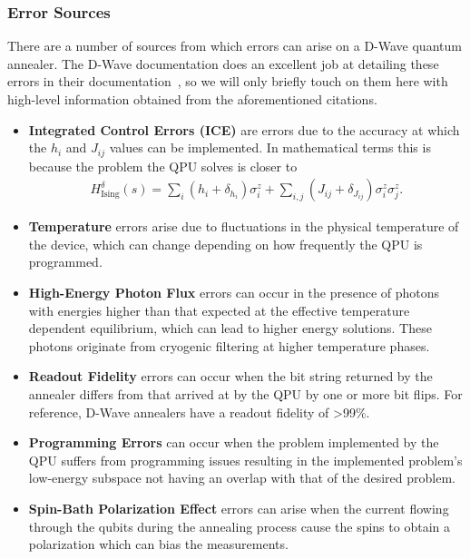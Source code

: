 \subsubsection{Error Sources}
There are a number of sources from which errors can arise on a D-Wave quantum annealer.
The D-Wave documentation does an excellent job at detailing these errors in their documentation~\cite{dwave_ice_errors,dwave_other_errors}, so we will only briefly touch on them here with high-level information obtained from the aforementioned citations.
\begin{itemize}
    \item \textbf{Integrated Control Errors (ICE)} are errors due to the accuracy at which the \( h_i \) and \( J_{ij} \) values can be implemented.
        In mathematical terms this is because the problem the QPU solves is closer to
        \begin{align}
            H_{\text{Ising}}^\delta(s) = \sum_i (h_i + \delta_{h_i}) \sigma_i^z + \sum_{i,j} (J_{ij} + \delta_{J_{ij}}) \sigma_i^z \sigma_j^z.
        \end{align}
    \item \textbf{Temperature} errors arise due to fluctuations in the physical temperature of the device, which can change depending on how frequently the QPU is programmed.
    \item \textbf{High-Energy Photon Flux} errors can occur in the presence of photons with energies higher than that expected at the effective temperature dependent equilibrium, which can lead to higher energy solutions. These photons originate from cryogenic filtering at higher temperature phases.
    \item \textbf{Readout Fidelity} errors can occur when the bit string returned by the annealer differs from that arrived at by the QPU by one or more bit flips.
        For reference, D-Wave annealers have a readout fidelity of >99\%.
    \item \textbf{Programming Errors} can occur when the problem implemented by the QPU suffers from programming issues resulting in the implemented problem's low-energy subspace not having an overlap with that of the desired problem.
    \item \textbf{Spin-Bath Polarization Effect} errors can arise when the current flowing through the qubits during the annealing process cause the spins to obtain a polarization which can bias the measurements.
\end{itemize}
